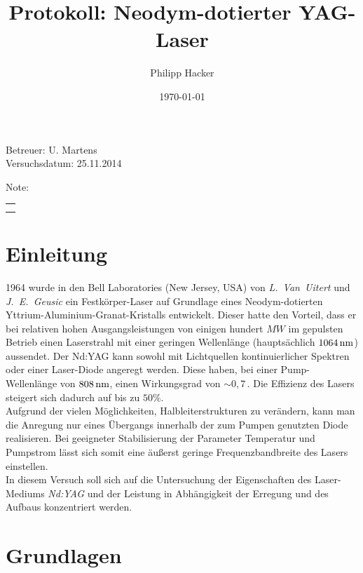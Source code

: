\documentclass[numbers=noenddot,12pt,a4paper]{scrartcl}
\title{Protokoll: Neodym-dotierter YAG-Laser} %
\author{Philipp Hacker} %
\date{\today}
\newcommand{\tilt}[1]{\mbox{\textit{#1}}}
\begin{document}
\maketitle
\begin{center}
Betreuer: U. Martens\\ %
Versuchsdatum: 25.11.2014\\ %
\begin{table}[h]
\centering
Note: %
\begin{tabularx}{1.5cm}{|X|}
\hline \\ \\
\hline
\end{tabularx}
\end{table}
\end{center}
\vspace*{\fill}
\tableofcontents
\vfill
\newpage
\section{Einleitung}
1964 wurde in den Bell Laboratories (New Jersey, USA) von \tilt{L. Van Uitert} und \tilt{J. E. Geusic} ein Festkörper-Laser auf Grundlage eines Neodym-dotierten Yttrium-Aluminium-Granat-Kristalls entwickelt. Dieser hatte den Vorteil, dass er bei relativen hohen Ausgangsleistungen von einigen hundert $\unit{MW}$ im gepulsten Betrieb einen Laserstrahl mit einer geringen Wellenlänge (hauptsächlich $\unit[1064]{nm}$) aussendet. Der Nd:YAG kann sowohl mit Lichtquellen kontinuierlicher Spektren oder einer Laser-Diode angeregt werden. Diese haben, bei einer Pump-Wellenlänge von $\unit[808]{nm}$, einen Wirkungsgrad von $\sim0,7\,$. Die Effizienz des Lasers steigert sich dadurch auf bis zu $50\%$.\\ Aufgrund der vielen Möglichkeiten, Halbleiterstrukturen zu verändern, kann man die Anregung nur eines Übergangs innerhalb der zum Pumpen genutzten Diode realisieren. Bei geeigneter Stabilisierung der Parameter Temperatur und Pumpstrom lässt sich somit eine äußerst geringe Frequenzbandbreite des Lasers einstellen. \\
In diesem Versuch soll sich auf die Untersuchung der Eigenschaften des Laser-Mediums \tilt{Nd:YAG} und der Leistung in Abhängigkeit der Erregung und des Aufbaus konzentriert werden.
\newpage
\section{Grundlagen}
\end{document}
